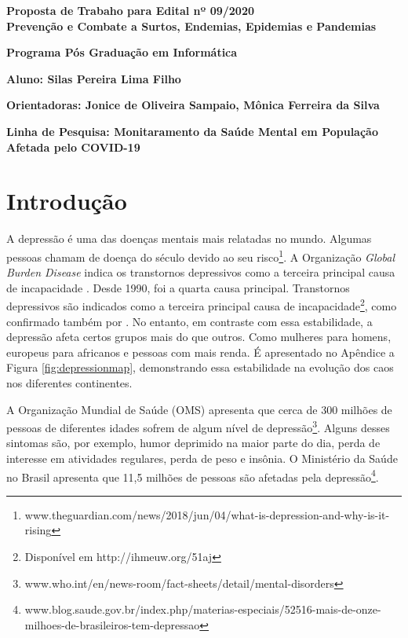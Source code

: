 \documentclass[11pt, notitlepage]{article} %
\begin{document}
\begin{center}
  \textbf{\Large{Proposta de Trabaho para Edital nº 09/2020}}
  \\
  \textbf{\Large{Prevenção e Combate a Surtos, Endemias, Epidemias e Pandemias}}
  \\
  \vspace{8pt}

  \textbf{Programa Pós Graduação em Informática}
  
  \vspace{8pt}
  \textbf{Aluno: Silas Pereira Lima Filho}

\textbf{Orientadoras: Jonice de Oliveira Sampaio, Mônica Ferreira da Silva}

\textbf{Linha de Pesquisa: Monitaramento da Saúde Mental em População Afetada pelo COVID-19}
\end{center}

\section*{Introdução}

A depressão é uma das doenças mentais mais relatadas no mundo. Algumas pessoas chamam de doença do século devido ao seu risco\footnote{www.theguardian.com/news/2018/jun/04/what-is-depression-and-why-is-it-rising}. 
A Organização \emph{Global Burden Disease} indica os transtornos depressivos como a terceira principal causa de incapacidade \cite{IHME}. Desde 1990, foi a quarta causa principal. 
Transtornos depressivos são indicados como a terceira principal causa de incapacidade\footnote{Disponível em http://ihmeuw.org/51aj}, como confirmado também por \cite{brody2018prevalence}. No entanto, em contraste com essa estabilidade, a depressão afeta certos grupos mais do que outros. Como mulheres para homens, europeus para africanos e pessoas com mais renda. É apresentado no Apêndice a Figura \ref{fig:depressionmap}, demonstrando essa estabilidade na evolução dos caos nos diferentes continentes.

A Organização Mundial de Saúde (OMS) apresenta que cerca de 300 milhões de pessoas de diferentes idades sofrem de algum nível de depressão\footnote{www.who.int/en/news-room/fact-sheets/detail/mental-disorders}. 
Alguns desses sintomas são, por exemplo, humor deprimido na maior parte do dia, perda de interesse em atividades regulares, perda de peso e insônia.
O Ministério da Saúde no Brasil apresenta que 11,5 milhões de pessoas são afetadas pela depressão\footnote{www.blog.saude.gov.br/index.php/materias-especiais/52516-mais-de-onze-milhoes-de-brasileiros-tem-depressao}.
\end{document}
